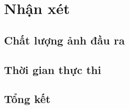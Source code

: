\section{Nhận xét}
\subsection{Chất lượng ảnh đầu ra}
\subsection{Thời gian thực thi}
\subsection{Tổng kết}